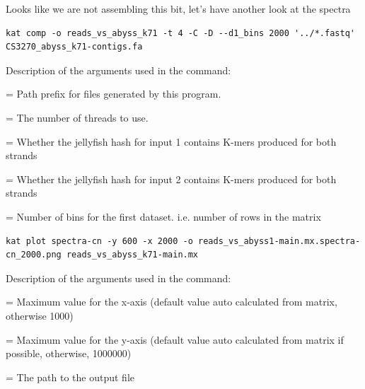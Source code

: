 \begin{steps}
Looks like we are not assembling this bit, let's have another look at the spectra
\begin{lstlisting}
kat comp -o reads_vs_abyss_k71 -t 4 -C -D --d1_bins 2000 '../*.fastq' CS3270_abyss_k71-contigs.fa
\end{lstlisting}
\end{steps}
Description of the arguments used in the command:
\begin{description}[style=multiline,labelindent=0cm,align=right,leftmargin=\descriptionlabelspace,rightmargin=1.5cm,font=\ttfamily]
  \item[o] = Path prefix for files generated by this program.
  \item[t] = The number of threads to use.  
  \item[C] = Whether the jellyfish hash for input 1 contains K-mers produced for both strands
  \item[D] = Whether the jellyfish hash for input 2 contains K-mers produced for both strands
  \item[--d1\_bins] = Number of bins for the first dataset. i.e. number of rows in the matrix
\end{description}

\begin{steps}
\begin{lstlisting}
kat plot spectra-cn -y 600 -x 2000 -o reads_vs_abyss1-main.mx.spectra-cn_2000.png reads_vs_abyss_k71-main.mx
\end{lstlisting}
\end{steps}
Description of the arguments used in the command:
\begin{description}[style=multiline,labelindent=0cm,align=right,leftmargin=\descriptionlabelspace,rightmargin=1.5cm,font=\ttfamily]
  \item[x] = Maximum value for the x-axis (default value auto calculated from matrix, otherwise 1000)
  \item[y] = Maximum value for the y-axis (default value auto calculated from matrix if possible, otherwise, 1000000)
  \item[o] = The path to the output file
\end{description}




